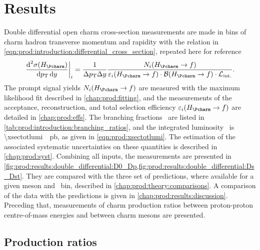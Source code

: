 \chapter{Results}
\label{chap:prod:results}

Double differential open charm cross-section measurements are made in bins of 
charm hadron transverse momentum and rapidity with the relation in 
\cref{eqn:prod:introduction:differential_cross_section}, repeated here for 
reference
\begin{equation*}
  \left.\frac{\dif^{2}{\xsec(\PHc)}}{\dif{\pT}\dif{\rapidity}}\right\rvert_{i}
    = \frac{1}{\Delta\pT\Delta\rapidity}
      \frac{%
        N_{i}(\HcTof)
      }{%
        \eff_{i}(\HcTof)\cdot\bfrac(\HcTof)\cdot\intlumi
      }.
\end{equation*}
The prompt signal yields $N_{i}(\HcTof)$ are measured with the maximum 
likelihood fit described in \cref{chap:prod:fitting}, and the measurements of 
the acceptance, reconstruction, and total selection efficiency 
$\eff_{i}(\HcTof)$ are detailed in \cref{chap:prod:effs}.
The branching fractions \bfrac\ are listed in 
\cref{tab:prod:introduction:branching_ratios}, and the integrated luminosity 
\intlumi\ is \SI{\xsectotlumi}{\per\pico\barn}, as given in 
\cref{eqn:prod:xsectotlumi}.
The estimation of the associated systematic uncertainties on these quantities 
is described in \cref{chap:prod:syst}.
Combining all inputs, the measurements are presented in 
\cref{fig:prod:results:double_differential:D0_Dp,fig:prod:results:double_differential:Ds_Dst}.
They are compared with the three set of predictions, where available for a 
given meson and \pTy\ bin, described in \cref{chap:prod:theory:comparisons}.
A comparison of the data with the predictions is given in 
\cref{chap:prod:results:discussion}.
Preceding that, measurements of charm production ratios between proton-proton 
centre-of-mass energies and between charm mesons are presented.

\section{Production ratios}
\label{chap:prod:results:ratios}

